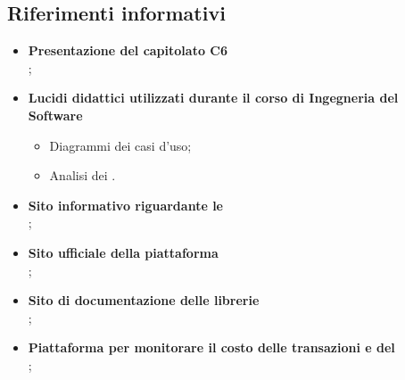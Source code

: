 \documentclass[AnalisiDeiRequisiti.tex]{subfiles}
\begin{document}
\subsection{Riferimenti informativi}
\begin{itemize}
	\item \textbf{Presentazione del capitolato C6}\\ ;
	\item \textbf{Lucidi didattici utilizzati durante il corso di Ingegneria del Software}\\ 
	\begin{itemize}
		\item Diagrammi dei casi d'uso;
		\item Analisi dei .
	\end{itemize}
	\item \textbf{Sito informativo riguardante le }\\ ;
	\item \textbf{Sito ufficiale della piattaforma }\\
	;
	\item \textbf{Sito di documentazione delle librerie }\\ ;
	\item \textbf{Piattaforma per monitorare il costo delle transazioni e del }\\ ;
\end{itemize}
\end{document}
